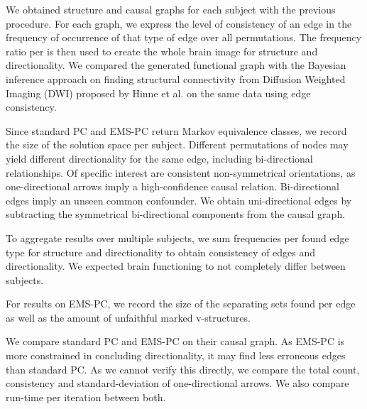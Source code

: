 \documentclass[a4paper, 10pt, english, onecolumn]{article}
\begin{document}
We obtained structure and causal graphs for each subject with the previous procedure.
For each graph, we express the level of consistency of an edge in the frequency of occurrence of that type of edge over all permutations.
The frequency ratio per is then used to create the whole brain image for structure and directionality.
We compared the generated functional graph with the Bayesian inference approach on finding structural connectivity from Diffusion Weighted Imaging (DWI) proposed by Hinne et al.\cite{hinne2013} on the same data using edge consistency.

Since standard PC and EMS-PC return Markov equivalence classes, we record the size of the solution space per subject.
Different permutations of nodes may yield different directionality for the same edge, including bi-directional relationships.
Of specific interest are consistent non-symmetrical orientations, as one-directional arrows imply a high-confidence causal relation.
Bi-directional edges imply an unseen common confounder.
We obtain uni-directional edges by subtracting the symmetrical bi-directional components from the causal graph.

To aggregate results over multiple subjects, we sum frequencies per found edge type for structure and directionality to obtain consistency of edges and directionality.
We expected brain functioning to not completely differ between subjects.

For results on EMS-PC, we record the size of the separating sets found per edge as well as the amount of unfaithful marked v-structures.

We compare standard PC and EMS-PC on their causal graph.
As EMS-PC is more constrained in concluding directionality, it may find less erroneous edges than standard PC.
As we cannot verify this directly, we compare the total count, consistency and standard-deviation of one-directional arrows.
We also compare run-time per iteration between both.
\end{document}
